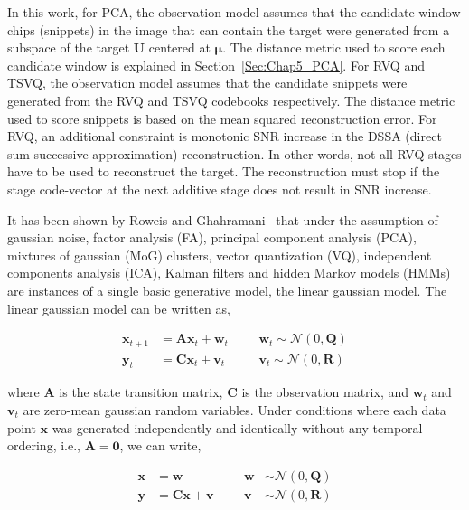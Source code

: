 In this work, for PCA, the observation model assumes that the candidate window chips (snippets) in the image that can contain the target were generated from a subspace of the target $\mathbf{U}$ centered at $\mathbf{\mu}$.  The distance metric used to score each candidate window is explained in Section~\ref{Sec:Chap5_PCA}.  For RVQ and TSVQ, the observation model assumes that the candidate snippets were generated from the RVQ and TSVQ codebooks respectively.  The distance metric used to score snippets is based on the mean squared reconstruction error.  For RVQ, an additional constraint is monotonic SNR increase in the DSSA (direct sum successive approximation) reconstruction.  In other words, not all RVQ stages have to be used to reconstruct the target.  The reconstruction must stop if the stage code-vector at the next additive stage does not result in SNR increase.


It has been shown by Roweis and Ghahramani~\cite{1999_JNL_Gaussian_roweis} that under the assumption of gaussian noise, factor analysis (FA), principal component analysis (PCA), mixtures of gaussian (MoG) clusters, vector quantization (VQ), independent components analysis (ICA), Kalman filters and hidden Markov models (HMMs) are instances of a single basic generative model, the linear gaussian model.  The linear gaussian model can be written as,

\begin{equation}
\begin{array}{llllllllllllll}
\mathbf{x}_{t+1} &=  \mathbf{A}\mathbf{x}_{t} +  \mathbf{w}_t   & & & \mathbf{w}_t \sim \mathcal{N}(0, \mathbf{Q})\\
\mathbf{y}_t 		 &=  \mathbf{C}\mathbf{x}_{t} +  \mathbf{v}_t    & & & \mathbf{v}_t \sim \mathcal{N}(0, \mathbf{R})
\end{array}
\label{LGM}
\end{equation}

where $\mathbf{A}$ is the state transition matrix, $\mathbf{C}$ is the observation matrix, and $\mathbf{w}_t$ and $\mathbf{v}_t$ are zero-mean gaussian random variables.  Under conditions where each data point $\mathbf{x}$ was generated independently and identically without any temporal ordering, i.e., $\mathbf{A}=\mathbf{0}$, we can write,

\begin{equation}
\begin{array}{llllllllllllll}
\mathbf{x} &= \mathbf{w} 											& & & \mathbf{w} &\sim \mathcal{N}(0, \mathbf{Q})\\
\mathbf{y} &=  \mathbf{C}\mathbf{x} +  \mathbf{v} 		& & & \mathbf{v} & \sim \mathcal{N}(0, \mathbf{R})
\end{array}
\label{LGM1}
\end{equation}



